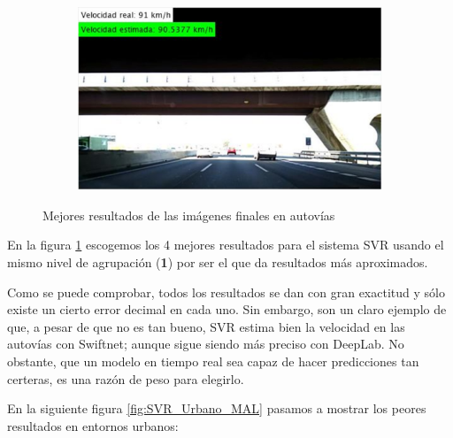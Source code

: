 \begin{figure}[H]
\begin{subfigure}[b]{0.475\linewidth}
  \end{subfigure}
  \begin{subfigure}[b]{0.475\linewidth}
    \includegraphics[width=\linewidth]{Figuras/Resultado_SVR_Autovia_BIEN_4.eps}
  \end{subfigure}
  \caption{Mejores resultados de las imágenes finales en autovías}
  \label{fig:SVR_Autovia_BIEN}
\end{figure}

En la figura \ref{fig:SVR_Autovia_BIEN} escogemos los 4 mejores resultados para el sistema \ac{SVR} usando el mismo nivel de agrupación (\textbf{1}) por ser el que da resultados más aproximados.

Como se puede comprobar, todos los resultados se dan con gran exactitud y sólo existe un cierto error decimal en cada uno. Sin embargo, son un claro ejemplo de que, a pesar de que no es tan bueno, \ac{SVR} estima bien la velocidad en las autovías con Swiftnet; aunque sigue siendo más preciso con DeepLab. No obstante, que un modelo en tiempo real sea capaz de hacer predicciones tan certeras, es una razón de peso para elegirlo.

En la siguiente figura \ref{fig:SVR_Urbano_MAL} pasamos a mostrar los peores resultados en entornos urbanos:

